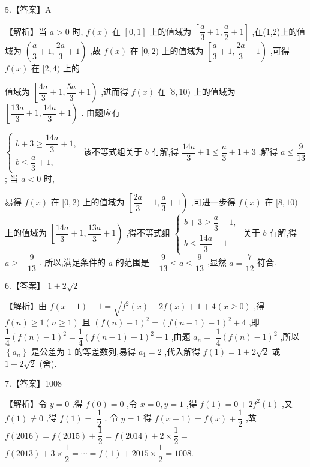 \documentclass[10pt]{article}
\begin{document}
5.【答案】A

【解析】当 $a > 0$ 时, $f\left( x\right)$ 在 $\left\lbrack  {0,1}\right\rbrack$ 上的值域为 $\left\lbrack  {\dfrac{a}{3} + 1,\dfrac{a}{2} + 1}\right\rbrack$ ,在(1,2)上的值域为 $\left( {\dfrac{a}{3} + 1,\dfrac{2a}{3} + 1}\right)$ ,故 $f\left( x\right)$ 在 $\lbrack 0,2)$ 上的值域为 $\left\lbrack  {\dfrac{a}{3} + 1,\dfrac{2a}{3} + 1}\right)$ ,可得 $f\left( x\right)$ 在 $\lbrack 2,4)$ 上的

值域为 $\left\lbrack  {\dfrac{4a}{3} + 1,\dfrac{5a}{3} + 1}\right)$ ,进而得 $f\left( x\right)$ 在 $\lbrack 8,{10})$ 上的值域为 $\left\lbrack  {\dfrac{13a}{3} + 1,\dfrac{14a}{3} + 1}\right)$ . 由题应有

$\left\{  \begin{array}{l} b + 3 \geq  \dfrac{14a}{3} + 1, \\  b \leq  \dfrac{a}{3} + 1, \end{array}\right.$ 该不等式组关于 $b$ 有解,得 $\dfrac{14a}{3} + 1 \leq  \dfrac{a}{3} + 1 + 3$ ,解得 $a \leq  \dfrac{9}{13}$ ; 当 $a < 0$ 时,

易得 $f\left( x\right)$ 在 $\lbrack 0,2)$ 上的值域为 $\left\lbrack  {\dfrac{2a}{3} + 1,\dfrac{a}{3} + 1}\right)$ ,可进一步得 $f\left( x\right)$ 在 $\lbrack 8,{10})$ 上的值域为 $\left\lbrack  {\dfrac{14a}{3} + 1,\dfrac{13a}{3} + 1}\right)$ ,得不等式组 $\left\{  \begin{array}{l} b + 3 \geq  \dfrac{a}{3} + 1, \\  b \leq  \dfrac{14a}{3} + 1 \end{array}\right.$ 关于 $b$ 有解,得 $a \geq   - \dfrac{9}{13}$ . 所以,满足条件的 $a$ 的范围是 $- \dfrac{9}{13} \leq  a \leq  \dfrac{9}{13}$ ,显然 $a = \dfrac{7}{12}$ 符合.

6.【答案】 $1 + 2\sqrt{2}$

【解析】由 $f\left( {x + 1}\right)  - 1 = \sqrt{{f}^{2}\left( x\right)  - {2f}\left( x\right)  + 1 + 4}\left( {x \geq  0}\right)$ ,得 $f\left( n\right)  \geq  1\left( {n \geq  1}\right)$ 且 ${\left( f\left( n\right)  - 1\right) }^{2} = {\left( f\left( n - 1\right)  - 1\right) }^{2} + 4$ ,即 $\dfrac{1}{4}{\left( f\left( n\right)  - 1\right) }^{2} = \dfrac{1}{4}{\left( f\left( n - 1\right)  - 1\right) }^{2} + 1$ ,由题 ${a}_{n} =$  $\dfrac{1}{4}{\left( f\left( n\right)  - 1\right) }^{2}$ ,所以 $\left\{  {a}_{n}\right\}$ 是公差为 1 的等差数列,易得 ${a}_{1} = 2$ ,代入解得 $f\left( 1\right)  = 1 + 2\sqrt{2}$ 或 $1 - 2\sqrt{2}$ (舍).

7.【答案】1008

【解析】令 $y = 0$ ,得 $f\left( 0\right)  = 0$ ,令 $x = 0,y = 1$ ,得 $f\left( 1\right)  = 0 + 2{f}^{2}\left( 1\right)$ ,又 $f\left( 1\right)  \neq  0$ ,得 $f\left( 1\right)  =$  $\dfrac{1}{2}$ . 令 $y = 1$ 得 $f\left( {x + 1}\right)  = f\left( x\right)  + \dfrac{1}{2}$ ,故 $f\left( {2016}\right)  = f\left( {2015}\right)  + \dfrac{1}{2} = f\left( {2014}\right)  + 2 \times  \dfrac{1}{2} =$  $f\left( {2013}\right)  + 3 \times  \dfrac{1}{2} = \cdots  = f\left( 1\right)  + {2015} \times  \dfrac{1}{2} = {1008}.$
\end{document}
